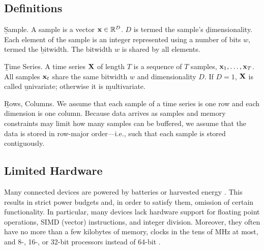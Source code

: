 \subsection{Definitions}
\begin{Definition} \b{Sample.} A sample is a vector $\mathbf{x} \in \mathbb{R}^D$. $D$ is termed the sample's \b{dimensionality}. Each element of the sample is an integer represented using a number of bits $w$, termed the \b{bitwidth}. The bitwidth $w$ is shared by all elements.
\end{Definition}
\begin{Definition} \b{Time Series.} A time series $\mathbf{X}$ of length $T$ is a sequence of $T$ samples, $\mathbf{x}_1,\ldots,\mathbf{x}_T$. All samples $\mathbf{x}_t$ share the same bitwidth $w$ and dimensionality $D$. If $D = 1$, $\mathbf{X}$ is called \b{univariate}; otherwise it is \b{multivariate}.
\end{Definition}
\begin{Definition} \b{Rows, Columns.} We assume that each sample of a time series is one row and each dimension is one column. Because data arrives as samples and memory constraints may limit how many samples can be buffered, we assume that the data is stored in row-major order---i.e., such that each sample is stored contiguously.
\end{Definition}

\subsection{Limited Hardware}

Many connected devices are powered by batteries or harvested energy \cite{bsnChallenges}. This results in strict power budgets and, in order to satisfy them, omission of certain functionality. In particular, many devices lack hardware support for floating point operations, SIMD (vector) instructions, and integer division. Moreover, they often have no more than a few kilobytes of memory, clocks in the tens of MHz at most, and 8-, 16-, or 32-bit processors instead of 64-bit \cite{cc2540, cc2640, quark}.


